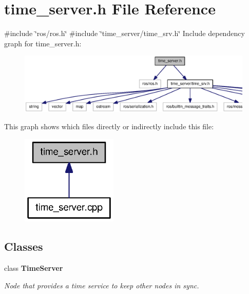 \section{time\-\_\-server.\-h \-File \-Reference}
\label{time__server_8h}
{\ttfamily \#include \char`\"{}ros/ros.\-h\char`\"{}}\*
{\ttfamily \#include \char`\"{}time\-\_\-server/time\-\_\-srv.\-h\char`\"{}}\*
\-Include dependency graph for time\-\_\-server.\-h\-:\nopagebreak
\begin{figure}[H]
\begin{center}
\leavevmode
\includegraphics[width=350pt]{time__server_8h__incl}
\end{center}
\end{figure}
\-This graph shows which files directly or indirectly include this file\-:\nopagebreak
\begin{figure}[H]
\begin{center}
\leavevmode
\includegraphics[width=130pt]{time__server_8h__dep__incl}
\end{center}
\end{figure}
\subsection*{\-Classes}
\begin{DoxyCompactItemize}
\item 
class {\bf \-Time\-Server}
\begin{DoxyCompactList}\small\item\em \-Node that provides a time service to keep other nodes in sync. \end{DoxyCompactList}\end{DoxyCompactItemize}
